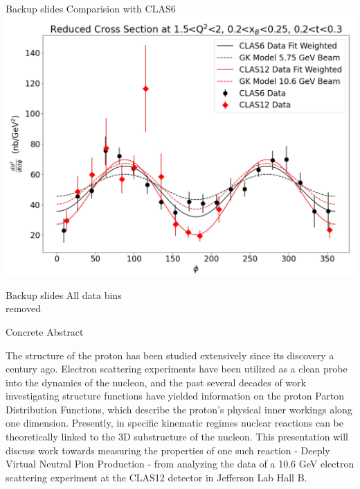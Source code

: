 \documentclass[aspectratio=169]{beamer}
\begin{document}
\begin{frame}{Backup slides}
\centering
Comparision with CLAS6\\

    \includegraphics[scale=0.2832]{DNP/comp_c12_gk_c6.jpg}\\
\end{frame}



\begin{frame}{Backup slides}
\centering
All data bins\\
removed
\end{frame}



\begin{frame}{Concrete Abstract}

The structure of the proton has been studied extensively since its discovery a century ago.  Electron scattering experiments have been utilized as a clean probe into the dynamics of the nucleon, and the past several decades of work investigating structure functions have yielded information on the proton Parton Distribution Functions, which describe the proton's physical inner workings along one dimension. Presently, in specific kinematic regimes nuclear reactions can be theoretically linked to the 3D substructure of the nucleon. This presentation will discuss work towards measuring the properties of one such reaction - Deeply Virtual Neutral Pion Production - from analyzing the data of a 10.6 GeV electron scattering experiment at the CLAS12 detector in Jefferson Lab Hall B. 

\end{frame}
\end{document}
